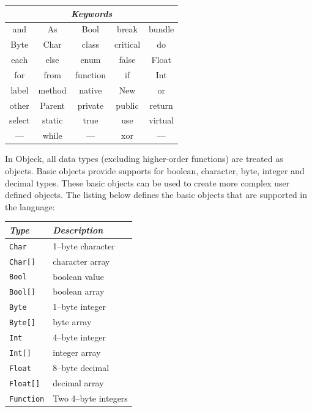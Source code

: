 \documentclass[12pt]{article}
\begin{document}
\begin{center}
  \begin{tabular}{ | c | c | c | c | c | }
    \hline
    \multicolumn{5}{|c|}{\emph{Keywords}} \\ \hline \hline
    and & As & Bool & break & bundle \\ \hline
    Byte & Char & class & critical & do \\ \hline
    each & else & enum & false & Float \\ \hline
    for & from & function & if & Int \\ \hline
    label & method & native & New & or \\ \hline
    other & Parent & private & public & return \\ \hline
    select & static & true & use & virtual \\ \hline
    --- & while & --- & xor & --- \\ \hline
  \end{tabular}
\end{center}

In Objeck, all data types (excluding higher-order functions) are
treated as objects. Basic objects provide supports for boolean,
character, byte, integer and decimal types.  These basic objects can
be used to create more complex user defined objects.  The listing below defines the basic objects that are supported in the language:

\begin{center}
  \begin{tabular}{| l | l |}
    \hline
    \emph{Type} & \emph{Description} \\ \hline \hline
    \texttt{Char} &  1--byte character \\ \hline
    \texttt{Char[]} &  character array \\ \hline
    \texttt{Bool} &  boolean value \\ \hline
    \texttt{Bool[]} &  boolean array \\ \hline
    \texttt{Byte} &  1--byte integer \\ \hline
    \texttt{Byte[]} &  byte array \\ \hline
    \texttt{Int} &  4--byte integer \\ \hline
    \texttt{Int[]} &  integer array \\ \hline
    \texttt{Float} &  8--byte decimal \\ \hline
    \texttt{Float[]} &  decimal array \\ \hline
    \texttt{Function} &  Two 4--byte integers \\ \hline
  \end{tabular}
\end{center}
\end{document}
